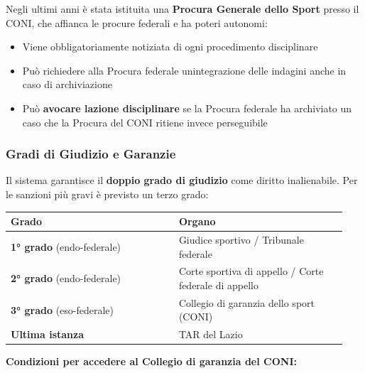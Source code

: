 \documentclass[a4paper,11pt]{article}
\providecommand{\tightlist}{%
  \setlength{\itemsep}{0pt}\setlength{\parskip}{0pt}}
\begin{document}
Negli ultimi anni è stata istituita una \textbf{Procura Generale dello
      Sport} presso il CONI, che affianca le procure federali e ha poteri
autonomi:

\begin{itemize}
      \tightlist
      \item
            Viene obbligatoriamente notiziata di ogni procedimento disciplinare
      \item
            Può richiedere alla Procura federale un\textquotesingle integrazione
            delle indagini anche in caso di archiviazione
      \item
            Può \textbf{avocare l\textquotesingle azione disciplinare} se la
            Procura federale ha archiviato un caso che la Procura del CONI ritiene
            invece perseguibile
\end{itemize}

\subsubsection{Gradi di Giudizio e
      Garanzie}\label{gradi-di-giudizio-e-garanzie}

Il sistema garantisce il \textbf{doppio grado di giudizio} come diritto
inalienabile. Per le sanzioni più gravi è previsto un terzo grado:

\begin{longtable}[]{@{}p{0.47\linewidth}p{0.47\linewidth}@{}}
      \toprule\noalign{}
      Grado                             & Organo                            \\
      \midrule\noalign{}
      \endhead
      \bottomrule\noalign{}
      \endlastfoot
      \textbf{1° grado} (endo-federale) & Giudice sportivo / Tribunale
      federale                                                              \\
      \textbf{2° grado} (endo-federale) & Corte sportiva di appello / Corte
      federale di appello                                                   \\
      \textbf{3° grado} (eso-federale)  & Collegio di garanzia dello sport
      (CONI)                                                                \\
      \textbf{Ultima istanza}           & TAR del Lazio                     \\
\end{longtable}

\textbf{Condizioni per accedere al Collegio di garanzia del CONI:}
\end{document}

